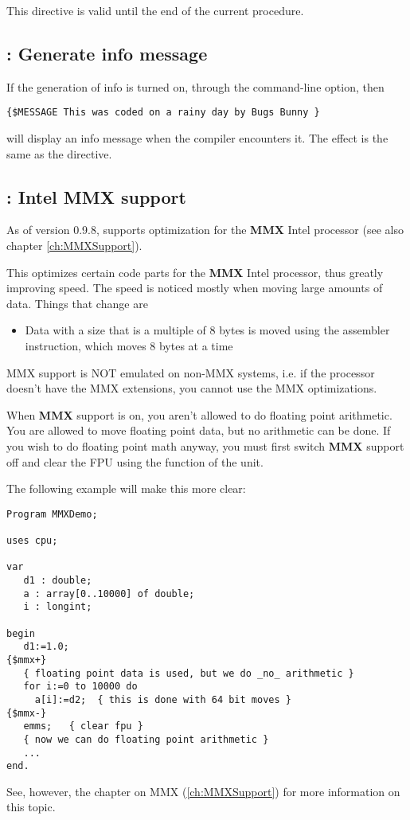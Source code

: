 \begin{remark}This directive is valid until the end of the current procedure.
\end{remark}

\subsection{ : Generate info message}

If the generation of info is turned on, through the  command-line
option, then
\begin{verbatim}
{$MESSAGE This was coded on a rainy day by Bugs Bunny }
\end{verbatim}
will display an info message when the compiler encounters it. The effect is
the same as the  directive.


\subsection{ : Intel MMX support}

As of version 0.9.8, \fpc supports optimization for the \textbf{MMX} Intel
processor (see also chapter \ref{ch:MMXSupport}).

This optimizes certain code parts for the \textbf{MMX} Intel
processor, thus greatly improving speed. The speed is noticed mostly when
moving large amounts of data. Things that change are
\begin{itemize}
\item Data with a size that is a multiple of 8 bytes is moved using the
 assembler instruction, which moves 8 bytes at a time
\end{itemize}
\begin{remark}MMX support is NOT emulated on non-MMX systems, i.e. if
the processor doesn't have the MMX extensions, you cannot use the MMX
optimizations.
\end{remark}
When \textbf{MMX} support is on, you aren't allowed to do floating point
arithmetic. You are allowed to move floating point data, but no arithmetic
can be done. If you wish to do floating point math anyway, you must first
switch \textbf{MMX} support off and clear the FPU using the 
function of the  unit.

The following example will make this more clear:
\begin{verbatim}
Program MMXDemo;

uses cpu;

var
   d1 : double;
   a : array[0..10000] of double;
   i : longint;

begin
   d1:=1.0;
{$mmx+}
   { floating point data is used, but we do _no_ arithmetic }
   for i:=0 to 10000 do
     a[i]:=d2;  { this is done with 64 bit moves }
{$mmx-}
   emms;   { clear fpu }
   { now we can do floating point arithmetic }
   ...
end.
\end{verbatim}
See, however, the chapter on MMX (\ref{ch:MMXSupport}) for more information
on this topic.

